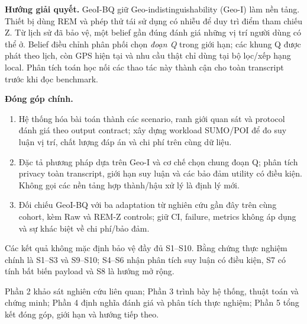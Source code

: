 \textbf{Hướng giải quyết.} GeoI-BQ giữ Geo-indistinguishability (Geo-I) làm nền tảng. Thiết bị dùng REM
và phép thử tái sử dụng có nhiễu để duy trì điểm tham chiếu Z. Từ lịch sử đã bảo vệ, một belief gần đúng
đánh giá những vị trí người dùng có thể ở. Belief điều chỉnh phân phối chọn \emph{đoạn Q} trong giới hạn;
các khung Q được phát theo lịch, còn GPS hiện tại và nhu cầu thật chỉ dùng tại bộ lọc/xếp hạng local.
Phân tích toán học nối các thao tác này thành cận cho toàn transcript trước khi đọc benchmark.

\textbf{Đóng góp chính.}
\begin{enumerate}
\item Hệ thống hóa bài toán thành các scenario, ranh giới quan sát và protocol đánh giá theo output contract;
xây dựng workload SUMO/POI để đo suy luận vị trí, chất lượng đáp án và chi phí trên cùng dữ liệu.
\item Đặc tả phương pháp dựa trên Geo-I và cơ chế chọn chung đoạn Q; phân tích privacy toàn transcript,
giới hạn suy luận và các bảo đảm utility có điều kiện. Không gọi các nền tảng hợp thành/hậu xử lý là định lý mới.
\item Đối chiếu GeoI-BQ với ba adaptation từ nghiên cứu gần đây trên cùng cohort, kèm Raw và REM-Z controls;
giữ CI, failure, metrics không áp dụng và sự khác biệt về chi phí/bảo đảm.
\end{enumerate}
Các kết quả không mặc định bảo vệ đầy đủ S1--S10. Bằng chứng thực nghiệm chính là S1--S3 và S9--S10;
S4--S6 nhận phân tích suy luận có điều kiện, S7 có tính bất biến payload và S8 là hướng mở rộng.

Phần 2 khảo sát nghiên cứu liên quan; Phần 3 trình bày hệ thống, thuật toán và chứng minh; Phần 4 định nghĩa
đánh giá và phân tích thực nghiệm; Phần 5 tổng kết đóng góp, giới hạn và hướng tiếp theo.
